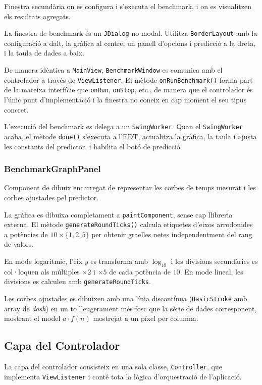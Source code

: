 \documentclass[conference,compsoc]{IEEEtran}
\begin{document}
Finestra secundària on es configura i s'executa el benchmark, i on es
visualitzen els resultats agregats.

La finestra de benchmark és un \texttt{JDialog} no modal. Utilitza
\texttt{BorderLayout} amb la configuració a dalt, la gràfica al centre,
un panell d'opcions i predicció a la dreta, i la taula de dades a baix.

De manera idèntica a \texttt{MainView}, \texttt{BenchmarkWindow} es
comunica amb el controlador a través de \texttt{ViewListener}. El mètode
\texttt{onRunBenchmark()} forma part de la mateixa interfície que
\texttt{onRun}, \texttt{onStop}, etc., de manera que el controlador
és l'únic punt d'implementació i la finestra no coneix en cap moment
el seu tipus concret.

L'execució del benchmark es delega a un \texttt{SwingWorker}. Quan el \texttt{SwingWorker}
acaba, el mètode \texttt{done()} s'executa a l'EDT, actualitza la gràfica,
la taula i ajusta les constants del predictor, i habilita el botó de
predicció.

\subsubsection{BenchmarkGraphPanel}

Component de dibuix encarregat de representar les corbes de temps
mesurat i les corbes ajustades pel predictor.

La gràfica es dibuixa completament a \texttt{paintComponent}, sense
cap llibreria externa. El mètode \texttt{generateRoundTicks()} calcula
etiquetes d'eixos arrodonides a potències de $10 \times \{1, 2, 5\}$
per obtenir graelles netes independentment del rang de valors.

En mode logarítmic, l'eix $y$ es transforma amb $\log_{10}$ i les
divisions secundàries es col·loquen als múltiples $\times 2$ i $\times 5$
de cada potència de $10$. En mode lineal, les divisions es calculen amb
\texttt{generateRoundTicks}.

Les corbes ajustades es dibuixen amb una línia discontínua
(\texttt{BasicStroke} amb array de \textit{dash}) en un to lleugerament
més fosc que la sèrie de dades corresponent, mostrant el model
$a \cdot f(n)$ mostrejat a un píxel per columna.

\subsection{Capa del Controlador}

La capa del controlador consisteix en una sola classe,
\texttt{Controller}, que implementa \texttt{ViewListener} i conté tota
la lògica d'orquestració de l'aplicació.
\end{document}
